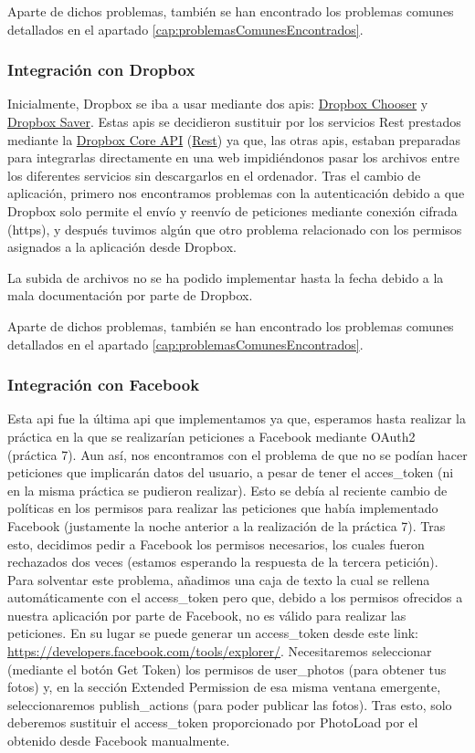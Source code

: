 \documentclass{scrartcl}
\begin{document}
Aparte de dichos problemas, también se han encontrado los problemas comunes detallados en el apartado \ref{cap:problemasComunesEncontrados}.
\subsubsection{Integración con Dropbox}
Inicialmente, Dropbox se iba a usar mediante dos apis: \href{https://www.dropbox.com/developers/dropins/chooser/js}{Dropbox Chooser} y \href{https://www.dropbox.com/developers/dropins/saver}{Dropbox Saver}. Estas apis se decidieron sustituir por los servicios Rest prestados mediante la \href{https://www.dropbox.com/developers/core}{Dropbox Core API} (\href{https://www.dropbox.com/developers/core/docs}{Rest}) ya que, las otras apis, estaban preparadas para integrarlas directamente en una web impidiéndonos pasar los archivos entre los diferentes servicios sin descargarlos en el ordenador. Tras el cambio de aplicación, primero nos encontramos problemas con la autenticación debido a que Dropbox solo permite el envío y reenvío de peticiones mediante conexión cifrada (https), y después tuvimos algún que otro problema relacionado con los permisos asignados a la aplicación desde Dropbox.

La subida de archivos no se ha podido implementar hasta la fecha debido a la mala documentación por parte de Dropbox.

Aparte de dichos problemas, también se han encontrado los problemas comunes detallados en el apartado \ref{cap:problemasComunesEncontrados}.

\subsubsection{Integración con Facebook}
Esta api fue la última api que implementamos ya que, esperamos hasta realizar la práctica en la que se realizarían peticiones a Facebook mediante OAuth2 (práctica 7). Aun así, nos encontramos con el problema de que no se podían hacer peticiones que implicarán datos del usuario, a pesar de tener el acces\_token (ni en la misma práctica se pudieron realizar). Esto se debía al reciente cambio de políticas en los permisos para realizar las peticiones que había implementado Facebook (justamente la noche anterior a la realización de la práctica 7). Tras esto, decidimos pedir a Facebook los permisos necesarios, los cuales fueron rechazados dos veces (estamos esperando la respuesta de la tercera petición). Para solventar este problema, añadimos una caja de texto la cual se rellena automáticamente con el access\_token pero que, debido a los permisos ofrecidos a nuestra aplicación por parte de Facebook, no es válido para realizar las peticiones. En su lugar se puede generar un access\_token desde este link: \url{https://developers.facebook.com/tools/explorer/}. Necesitaremos seleccionar (mediante el botón Get Token) los permisos de user\_photos (para obtener tus fotos) y, en la sección Extended Permission de esa misma ventana emergente, seleccionaremos publish\_actions (para poder publicar las fotos). Tras esto, solo deberemos sustituir el access\_token  proporcionado por PhotoLoad por el obtenido desde Facebook manualmente.
\end{document}
